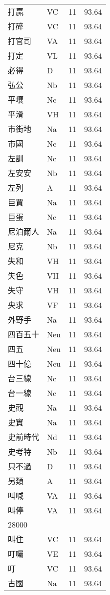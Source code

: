 \documentclass[twocolumn]{book}
\begin{document}
\begin{supertabular}{llrr}
打贏 & VC & 11 &  93.64\\
打碎 & VC & 11 &  93.64\\
打官司 & VA & 11 &  93.64\\
打定 & VL & 11 &  93.64\\
必得 & D & 11 &  93.64\\
弘公 & Nb & 11 &  93.64\\
平壤 & Nc & 11 &  93.64\\
平滑 & VH & 11 &  93.64\\
市街地 & Na & 11 &  93.64\\
市國 & Nc & 11 &  93.64\\
左訓 & Nc & 11 &  93.64\\
左安安 & Nb & 11 &  93.64\\
左列 & A & 11 &  93.64\\
巨賈 & Na & 11 &  93.64\\
巨蛋 & Nc & 11 &  93.64\\
尼泊爾人 & Na & 11 &  93.64\\
尼克 & Nb & 11 &  93.64\\
失和 & VH & 11 &  93.64\\
失色 & VH & 11 &  93.64\\
失守 & VH & 11 &  93.64\\
央求 & VF & 11 &  93.64\\
外野手 & Na & 11 &  93.64\\
四百五十 & Neu & 11 &  93.64\\
四五 & Neu & 11 &  93.64\\
四十億 & Neu & 11 &  93.64\\
台三線 & Nc & 11 &  93.64\\
台一線 & Nc & 11 &  93.64\\
史觀 & Na & 11 &  93.64\\
史實 & Na & 11 &  93.64\\
史前時代 & Nd & 11 &  93.64\\
史考特 & Nb & 11 &  93.64\\
只不過 & D & 11 &  93.64\\
另類 & A & 11 &  93.64\\
叫喊 & VA & 11 &  93.64\\
叫停 & VA & 11 &  93.64\\
28000\\
叫住 & VC & 11 &  93.64\\
叮囑 & VE & 11 &  93.64\\
叮 & VC & 11 &  93.64\\
古國 & Na & 11 &  93.64\\

\end{supertabular}
\end{document}
